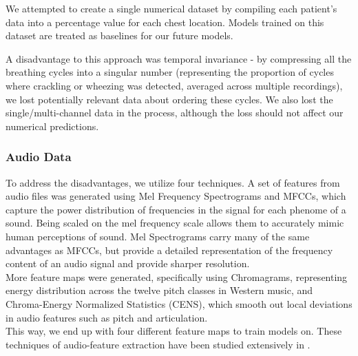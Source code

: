 \documentclass[10pt,twocolumn,letterpaper]{article}
\begin{document}
We attempted to create a single numerical dataset by compiling each patient's data into a percentage value for each chest location. Models trained on this dataset are treated as baselines for our future models.


A disadvantage to this approach was temporal invariance - by compressing all the breathing cycles into a singular number (representing the proportion of cycles where crackling or wheezing was detected, averaged across multiple recordings), we lost potentially relevant data about ordering these cycles. We also lost the single/multi-channel data in the process, although the loss should not affect our numerical predictions.

\subsubsection*{Audio Data}
To address the disadvantages, we utilize four techniques. A set of features from audio files was generated using Mel Frequency Spectrograms and MFCCs, which capture the power distribution of frequencies in the signal for each phenome of a sound. Being scaled on the mel frequency scale allows them to accurately mimic human perceptions of sound. Mel Spectrograms carry many of the same advantages as MFCCs, but provide a detailed representation of the frequency content of an audio signal and provide sharper resolution. \\
More feature maps were generated, specifically using Chromagrams, representing energy distribution across the twelve pitch classes in Western music, and Chroma-Energy Normalized Statistics (CENS), which smooth out local deviations in audio features such as pitch and articulation. \\
This way, we end up with four different feature maps to train models on. These techniques of audio-feature extraction have been studied extensively in \cite{srivastava}.
\end{document}
